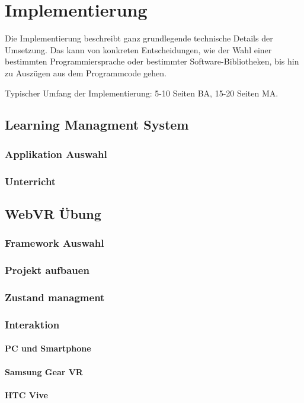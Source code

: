 \chapter{Implementierung}

Die Implementierung beschreibt ganz grundlegende technische Details der Umsetzung. Das kann von konkreten Entscheidungen, wie der Wahl einer bestimmten Programmiersprache oder bestimmter Software-Bibliotheken, bis hin zu Auszügen aus dem Programmcode gehen.

Typischer Umfang der Implementierung: 5-10 Seiten BA, 15-20 Seiten MA.

\section{Learning Managment System}
 \subsection{Applikation Auswahl}
 \subsection{Unterricht}
 
\section{WebVR Übung}
 \subsection{Framework Auswahl}
 \subsection{Projekt aufbauen}
 \subsection{Zustand managment}
 \subsection{Interaktion}
  \subsubsection{PC und Smartphone}
  \subsubsection{Samsung Gear VR}
  \subsubsection{HTC Vive}
